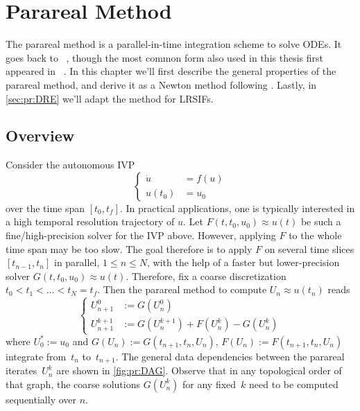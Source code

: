 \chapter{Parareal Method}
\label{sec:pr}

The parareal method is a parallel-in-time integration scheme to solve \acp{ODE}.
It goes back to \citeauthor{Lions2001}~\cite{Lions2001},
though the most common form also used in this thesis first appeared in \citeauthor{Baffico2002}~\cite{Baffico2002}.
In this chapter we'll first describe the general properties of the parareal method,
and derive it as a Newton method following \cite{Gander2007}.
Lastly, in \autoref{sec:pr:DRE} we'll adapt the method for \acp{LRSIF}.

\section{Overview}
\label{sec:pr:properties}

Consider the autonomous \ac{IVP}
\begin{equation}
  \label{eq:IVP}
  \left\{
  \begin{aligned}
    \dot u &= f(u) \\
    u(t_0) &= u_0
  \end{aligned}
  \right.
\end{equation}
over the time span $[t_0, t_f]$.
In practical applications,
one is typically interested in a high temporal resolution trajectory of $u$.
Let $F(t, t_0, u_0) \approx u(t)$ be such a fine/high-precision solver for the \ac{IVP} above.
However, applying $F$ to the whole time span may be too slow.
The goal therefore is to apply $F$ on several time slices $[t_{n-1}, t_n]$ in parallel,
$1 \leq n \leq N$,
with the help of a faster but lower-precision solver $G(t, t_0, u_0) \approx u(t)$.
Therefore, fix a coarse discretization $t_0 < t_1 < \ldots < t_N = t_f$.
Then the parareal method to compute $U_n \approx u(t_n)$ reads
\begin{equation}
  \label{eq:pr:method}
  \left\{
  \begin{aligned}
    U^0_{n+1} &:= G(U^0_n) \\
    U^{k+1}_{n+1} &:= G(U^{k+1}_n) + F(U^k_n) - G(U^k_n)
  \end{aligned}
  \right.
\end{equation}
where $U^*_0 := u_0$ and $G(U_n) := G(t_{n+1}, t_n, U_n)$,
$F(U_n) := F(t_{n+1}, t_n, U_n)$
integrate from~$t_n$ to~$t_{n+1}$.
The general data dependencies between the parareal iterates~$U_n^k$
are shown in \autoref{fig:pr:DAG}.
Observe that in any topological order of that graph,
the coarse solutions $G(U_n^k)$ for any fixed~$k$ need to be computed sequentially over $n$.

